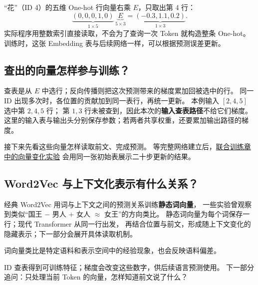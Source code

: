 “花”（ID 4）的五维 One-hot 行向量右乘 $E$，只取出第 4 行：
\[
\underbrace{(0,0,0,1,0)}_{1\times5}\,
\underbrace{E}_{5\times3}
=\underbrace{(-0.3,1.1,0.2)}_{1\times3}.
\]
实际程序用整数索引直接读取，不会为了查询一次 Token 就构造整条 One-hot。
训练时，这张 Embedding 表与后续网络一样，可以根据预测误差更新。

\subsection{查出的向量怎样参与训练？}

查表是从 $E$ 中选行；反向传播则把这次预测带来的梯度累加回被选中的行。
同一 ID 出现多次时，各位置的贡献加到同一表行，再统一更新。
本例输入 $[2,4,5]$ 选中第 $2,4,5$ 行；
第 $1,3$ 行未被查到，因此本次的\textbf{输入查表路径}不给它们梯度。
这里的输入表与输出头分别保存参数；若两者共享权重，还要累加输出路径的梯度。

接下来先看这些向量怎样读取前文、完成预测。
等完整网络建立后，\hyperref[sec:embedding-training-snapshot]{联合训练章中的向量变化实验}
会用同一张初始表展示二十步更新的结果。

\subsection{Word2Vec 与上下文化表示有什么关系？}

经典 Word2Vec 用词与上下文之间的预测关系训练\textbf{静态词向量}，
一些实验曾观察到类似“国王 $-$ 男人 $+$ 女人 $\approx$ 女王”的方向类比。
静态词向量为每个词保存一行；现代 Transformer 从同一行出发，
再结合位置与前文，形成随上下文变化的隐藏表示；下一部分会展开具体读取机制。

词向量类比是特定语料和表示空间中的经验现象，也会反映语料偏差。



\par\smallskip
ID 查表得到可训练特征；梯度会改变这些数字，供后续语言预测使用。
下一部分追问：只处理当前 Token 的向量，怎样知道前文说了什么？\label{route:embedding-end}
